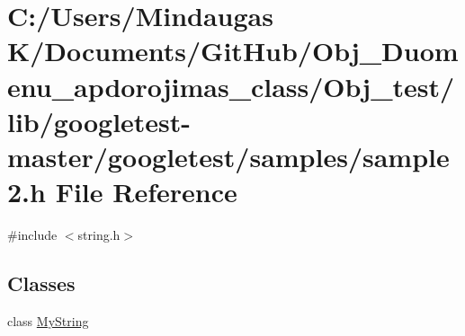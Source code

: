 \hypertarget{_obj__test_2lib_2googletest-master_2googletest_2samples_2sample2_8h}{}\section{C\+:/\+Users/\+Mindaugas K/\+Documents/\+Git\+Hub/\+Obj\+\_\+\+Duomenu\+\_\+apdorojimas\+\_\+class/\+Obj\+\_\+test/lib/googletest-\/master/googletest/samples/sample2.h File Reference}
\label{_obj__test_2lib_2googletest-master_2googletest_2samples_2sample2_8h}
{\ttfamily \#include $<$string.\+h$>$}\newline
\subsection*{Classes}
\begin{DoxyCompactItemize}
\item 
class \mbox{\hyperlink{class_my_string}{My\+String}}
\end{DoxyCompactItemize}
